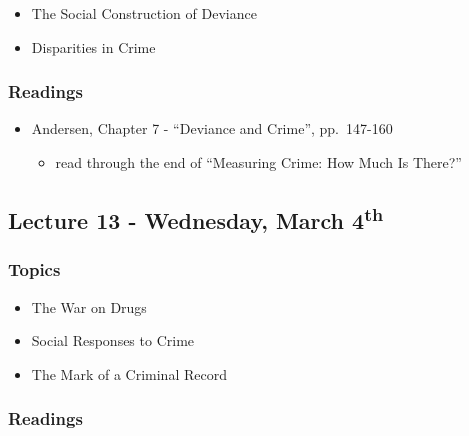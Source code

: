 \documentclass[]{book}
\providecommand{\tightlist}{%
  \setlength{\itemsep}{0pt}\setlength{\parskip}{0pt}}
\begin{document}
\begin{itemize}
\tightlist
\item
  The Social Construction of Deviance
\item
  Disparities in Crime
\end{itemize}

\hypertarget{readings-13}{%
\subsubsection*{Readings}\label{readings-13}}

\begin{itemize}
\tightlist
\item
  Andersen, Chapter 7 - ``Deviance and Crime'', pp.~147-160

  \begin{itemize}
  \tightlist
  \item
    read through the end of ``Measuring Crime: How Much Is There?''
  \end{itemize}
\end{itemize}

\hypertarget{lecture-13---wednesday-march-4th}{%
\subsection*{\texorpdfstring{Lecture 13 - Wednesday, March 4\textsuperscript{th}}{Lecture 13 - Wednesday, March 4th}}\label{lecture-13---wednesday-march-4th}}

\hypertarget{topics-15}{%
\subsubsection*{Topics}\label{topics-15}}

\begin{itemize}
\tightlist
\item
  The War on Drugs
\item
  Social Responses to Crime
\item
  The Mark of a Criminal Record
\end{itemize}

\hypertarget{readings-14}{%
\subsubsection*{Readings}\label{readings-14}}
\end{document}
